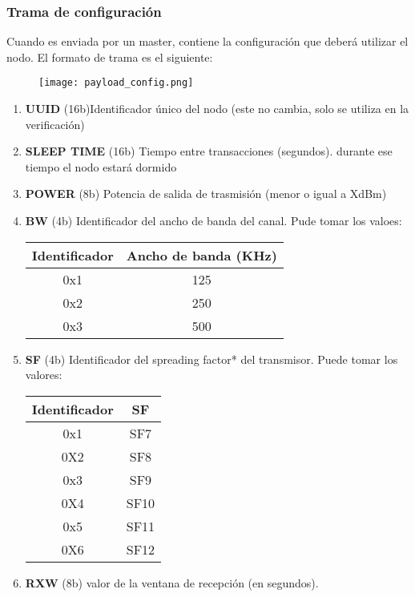 \subsubsection{Trama de configuración} \label{ConfigPay}
	
	
	Cuando es enviada por un master, contiene la configuración que deberá utilizar el nodo. El formato de trama es el siguiente:
	
	\begin{figure}[!h]
		\texttt{[image: payload\_config.png]}
		\centering
	\end{figure}
	
	\begin{enumerate}
		\item \textbf{UUID } (16b)Identificador único del nodo (este no cambia, solo se utiliza en la verificación)
		\item \textbf{SLEEP TIME } (16b) Tiempo entre transacciones (segundos). durante ese tiempo el nodo estará dormido
		\item \textbf{POWER } (8b) Potencia de salida de trasmisión (menor o igual a XdBm)
		\item \textbf{BW } (4b) Identificador del ancho de banda del canal. Pude tomar los valoes:
		\begin{center}
			\begin{tabular}{| c c |}
				\hline
				Identificador & Ancho de banda (KHz) \\
				\hline \hline
				0x1 & 125\\
				0x2 & 250 \\
				0x3 & 500 \\
				\hline
		
			\end{tabular}
		\end{center}

		\item \textbf{SF} (4b) Identificador del spreading factor* del transmisor. Puede tomar los valores:
		\begin{center}
			\begin{tabular}{|c c|}
				\hline
				Identificador & SF \\
				\hline \hline
				0x1 & SF7 \\
				0X2 & SF8 \\
				0x3 & SF9 \\
				0X4 & SF10 \\
				0x5 & SF11 \\
				0X6 & SF12 \\
				\hline
			\end{tabular}
		\end{center}
		
		\item \textbf{RXW} (8b) valor de la ventana de recepción (en segundos).
	\end{enumerate}
	

